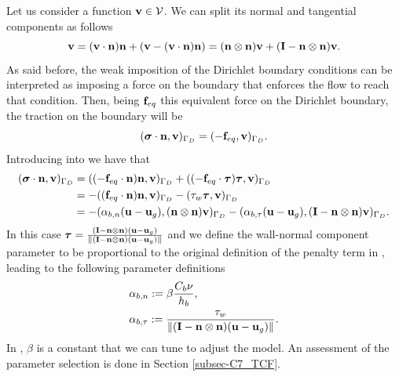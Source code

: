 Let us consider a function $ {\bf v}\in\mathcal{V} $. We can split its normal and tangential components as follows
\begin{equation}
\label{eq-C7_v_decomposition}
{\bf v} = ({\bf v}\cdot{\bf n}){\bf n} + ({\bf v}-({\bf v}\cdot{\bf n}){\bf n})=({\bf n}\otimes{\bf n}){\bf v} + (\mathbf{I}-{\bf n}\otimes{\bf n}){\bf v}.
\end{equation}
As said before, the weak imposition of the Dirichlet boundary conditions can be interpreted as imposing a force on the boundary that enforces the flow to reach that condition. Then, being $ {\bf f}_{eq} $ this equivalent force on the Dirichlet boundary, the traction on the boundary will be
\begin{equation}
\label{eq-C7_traction}
(\boldsymbol{\sigma}\cdot{\bf n},{\bf v})_{\Gamma_D} = (-{\bf f}_{eq},{\bf v})_{\Gamma_D}.
\end{equation}
Introducing  into  we have that
\begin{align}
\label{eq-C7_traction_decomposition}
(\boldsymbol{\sigma}\cdot{\bf n},{\bf v})_{\Gamma_D} &= ((-{\bf f}_{eq}\cdot{\bf n}){\bf n},{\bf v})_{\Gamma_D}+((-{\bf f}_{eq}\cdot\boldsymbol{\tau})\boldsymbol{\tau},{\bf v})_{\Gamma_D}\\\nonumber
&=-(({\bf f}_{eq}\cdot{\bf n}){\bf n},{\bf v})_{\Gamma_D} - (\tau_w\boldsymbol{\tau},{\bf v})_{\Gamma_D}\\\nonumber
&=-(\alpha_{b,n}({\bf u}-{\bf u}_g),({\bf n}\otimes{\bf n}){\bf v})_{\Gamma_D} - (\alpha_{b,\tau}({\bf u}-{\bf u}_g),(\mathbf{I}-{\bf n}\otimes{\bf n}){\bf v})_{\Gamma_D}.
\end{align}
In this case $ \boldsymbol{\tau}=\frac{(\mathbf{I}-{\bf n}\otimes{\bf n})({\bf u}-{\bf u}_g)}{\|(\mathbf{I}-{\bf n}\otimes{\bf n})({\bf u}-{\bf u}_g)\|} $ and we define the wall-normal component parameter to be proportional to the original definition of the penalty term in \cite{bazilevs_weak_2007-1}, leading to the following parameter definitions
\begin{align}
\label{eq-C7_alpha_b_n}
&\alpha_{b,n}:=\beta\frac{C_b\nu}{h_b},\\
\label{eq-C7_alpha_b_t}
&\alpha_{b,\tau}:=\frac{\tau_w}{\|(\mathbf{I}-{\bf n}\otimes{\bf n})({\bf u}-{\bf u}_g)\|}.
\end{align}
In , $ \beta $ is a constant that we can tune to adjust the model. An assessment of the parameter selection is done in Section \ref{subsec-C7_TCF}.

